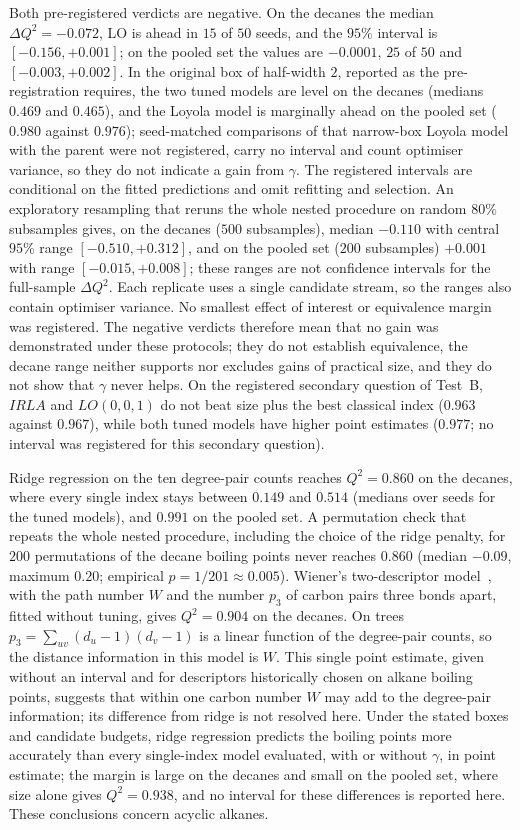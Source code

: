 \documentclass[a5paper, 10pt]{article}
\theoremstyle{plain}
\theoremstyle{remark}
\theoremstyle{definition}
\begin{document}
Both pre-registered verdicts are negative. On the decanes the median
$\Delta Q^2 = -0.072$, LO is ahead in $15$ of $50$ seeds, and the $95\%$
interval is $[-0.156, +0.001]$; on the pooled set the values are
$-0.0001$, $25$ of $50$ and $[-0.003, +0.002]$. In the original box of
half-width $2$, reported as the pre-registration requires, the two tuned
models are level on the decanes (medians $0.469$ and $0.465$), and the
Loyola model is marginally ahead on the pooled set ($0.980$ against
$0.976$); seed-matched comparisons of that narrow-box Loyola model with the
parent were not registered, carry no interval and count optimiser
variance, so they do not indicate a gain from $\gamma$. The registered
intervals are conditional on the fitted predictions and omit refitting and
selection. An exploratory resampling that reruns the whole nested procedure
on random $80\%$ subsamples gives, on the decanes ($500$ subsamples),
median $-0.110$ with central $95\%$ range $[-0.510, +0.312]$, and on the
pooled set ($200$ subsamples) $+0.001$ with range $[-0.015, +0.008]$;
these ranges are not confidence intervals for the full-sample
$\Delta Q^2$. Each replicate uses a single candidate stream, so the ranges
also contain optimiser variance. No smallest effect of interest or equivalence margin was
registered. The negative verdicts therefore mean that no gain was
demonstrated under these protocols; they do not establish equivalence, the
decane range neither supports nor excludes gains of practical size, and
they do not show that $\gamma$ never helps. On the registered secondary
question of Test~B, $IRLA$ and $LO(0,0,1)$ do not beat size plus the best
classical index ($0.963$ against $0.967$), while both tuned models have
higher point estimates ($0.977$; no interval was registered for this
secondary question).

Ridge regression on the ten degree-pair counts reaches $Q^2 = 0.860$ on
the decanes, where every single index stays between $0.149$ and $0.514$
(medians over seeds for the tuned models),
and $0.991$ on the pooled set. A permutation check that repeats the whole nested
procedure, including the choice of the ridge penalty, for $200$
permutations of the decane boiling points never reaches $0.860$ (median
$-0.09$, maximum $0.20$; empirical $p = 1/201 \approx 0.005$). Wiener's
two-descriptor model~\cite{Wiener1947}, with the path number $W$ and the
number $p_3$ of carbon pairs three bonds apart, fitted without tuning,
gives $Q^2 = 0.904$ on the decanes. On trees
$p_3 = \sum_{uv}(d_u - 1)(d_v - 1)$ is a linear function of the degree-pair
counts, so the distance information in this model is $W$. This single
point estimate, given without an interval and for descriptors historically
chosen on alkane boiling points, suggests that within one carbon number
$W$ may add to the degree-pair information; its difference from ridge is
not resolved here.
Under the stated boxes and candidate budgets, ridge regression predicts
the boiling points more accurately than every single-index model
evaluated, with or without $\gamma$, in point estimate; the margin is
large on the decanes and small on the pooled set, where size alone gives
$Q^2 = 0.938$, and no interval for these differences is reported here. These conclusions concern acyclic
alkanes.
\end{document}
